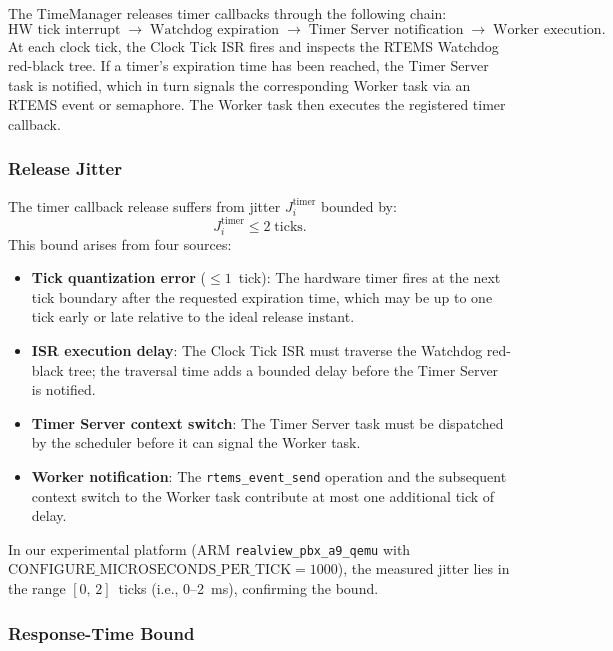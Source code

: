 The TimeManager releases timer callbacks through the following chain:
\begin{equation}
    \text{HW tick interrupt} \;\to\; \text{Watchdog expiration} \;\to\; \text{Timer Server notification} \;\to\; \text{Worker execution}.
\end{equation}
At each clock tick, the Clock Tick ISR fires and inspects the RTEMS Watchdog red-black tree.
If a timer's expiration time has been reached, the Timer Server task is notified, which in turn signals the corresponding Worker task via an RTEMS event or semaphore.
The Worker task then executes the registered timer callback.

\subsubsection{Release Jitter}

The timer callback release suffers from jitter $J_i^{\mathrm{timer}}$ bounded by:
\begin{equation}
    J_i^{\mathrm{timer}} \leqslant 2 \; \text{ticks}.
\end{equation}
This bound arises from four sources:
\begin{itemize}
    \item \textbf{Tick quantization error} ($\leqslant 1$~tick): The hardware timer fires at the next tick boundary after the requested expiration time, which may be up to one tick early or late relative to the ideal release instant.
    \item \textbf{ISR execution delay}: The Clock Tick ISR must traverse the Watchdog red-black tree; the traversal time adds a bounded delay before the Timer Server is notified.
    \item \textbf{Timer Server context switch}: The Timer Server task must be dispatched by the scheduler before it can signal the Worker task.
    \item \textbf{Worker notification}: The \texttt{rtems\_event\_send} operation and the subsequent context switch to the Worker task contribute at most one additional tick of delay.
\end{itemize}
In our experimental platform (ARM \texttt{realview\_pbx\_a9\_qemu} with $\text{CONFIGURE\_MICROSECONDS\_PER\_TICK} = 1000$), the measured jitter lies in the range $[0,\,2]$~ticks (i.e., 0--2~ms), confirming the bound.

\subsubsection{Response-Time Bound}

